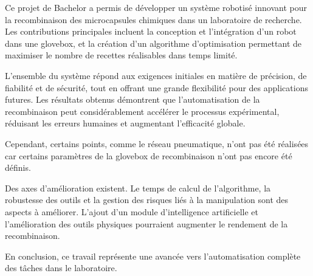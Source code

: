 Ce projet de Bachelor a permis de développer un système robotisé innovant pour la recombinaison des \glspl{microcapsule} chimiques dans un laboratoire de recherche. Les contributions principales incluent la conception et l'intégration d'un robot dans une \gls{glovebox}, et la création d'un algorithme d'optimisation permettant de maximiser le nombre de \glspl{recette} réalisables dans temps limité.

L'ensemble du système répond aux exigences initiales en matière de précision, de fiabilité et de sécurité, tout en offrant une grande flexibilité pour des applications futures. Les résultats obtenus démontrent que l'automatisation de la recombinaison peut considérablement accélérer le processus expérimental, réduisant les erreurs humaines et augmentant l'efficacité globale.

Cependant, certains points, comme le réseau pneumatique, n'ont pas été réalisées car certains paramètres de la \gls{glovebox} de recombinaison n'ont pas encore été définis.

Des axes d'amélioration existent. Le temps de calcul de l'algorithme, la robustesse des outils et la gestion des risques liés à la manipulation sont des aspects à améliorer. L'ajout d'un module d'intelligence artificielle et l'amélioration des outils physiques pourraient augmenter le rendement de la recombinaison.

En conclusion, ce travail représente une avancée vers l'automatisation complète des tâches dans le laboratoire.

\vfil
\hspace{8cm}\makeatletter\@author\makeatother\par
\hspace{8cm}\begin{minipage}{5cm}
\end{minipage}